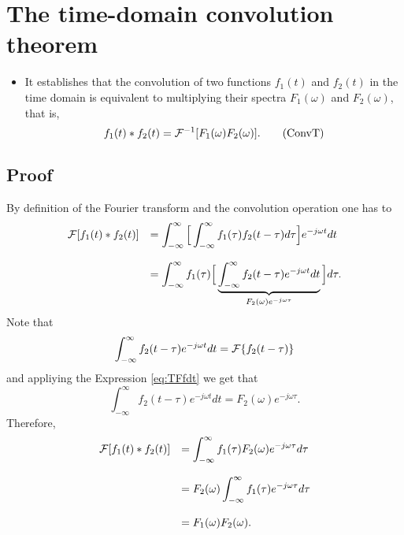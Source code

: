 \section{The time-domain convolution theorem}
\begin{itemize}
\item It establishes that the convolution of two functions $f_1(t)$ and
  $f_2(t)$ in the time domain is equivalent to multiplying their spectra
  $F_1(\omega)$ and $F_2(\omega)$, that is,
\begin{equation}
  f_1(t)*f_2(t) = {\cal F}^{-1}[F_1(\omega)F_2(\omega)].
  \tag{ConvT}
  \label{eq:teorema_convolucion_tiempo}
\end{equation}
\end{itemize}

\subsection*{Proof}
\noindent By definition of the Fourier transform and the convolution
operation one has to
\begin{equation*}
  \begin{array}{rl}
    {\cal F}[f_1(t)*f_2(t)] & = \displaystyle\int_{-\infty}^\infty
    \Big[\int_{-\infty}^\infty
      f_1(\tau)f_2(t-\tau)d\tau\Big]e^{-j\omega t}dt\\\\
    & = \displaystyle\int_{-\infty}^\infty
    f_1(\tau)\Big[\underbrace{\int_{-\infty}^\infty f_2(t-\tau)e^{-j\omega t}dt}_{F_2(\omega)e^{-j\omega\tau}}\Big]d\tau.
  \end{array}
\end{equation*}
Note that
\begin{equation*}
  \int_{-\infty}^\infty f_2(t-\tau)e^{-j\omega t}dt = {\cal{F}}\{f_2(t-\tau)\}
\end{equation*}
and appliying the Expression \ref{eq:TFfdt} we get that
\begin{equation*}
  \int_{-\infty}^\infty f_2(t-\tau)e^{-j\omega t}dt = F_2(\omega)e^{-j\omega\tau}.
\end{equation*}
Therefore,
\begin{equation*}
  \begin{array}{rl}
    {\cal F}[f_1(t)*f_2(t)] & = \displaystyle\int_{-\infty}^\infty
    f_1(\tau)F_2(\omega)e^{-j\omega\tau}d\tau \\\\
    & = F_2(\omega)\displaystyle\int_{-\infty}^\infty f_1(\tau)e^{-j\omega\tau}d\tau\\\\
    & = F_1(\omega)F_2(\omega).
  \end{array}
\end{equation*}

